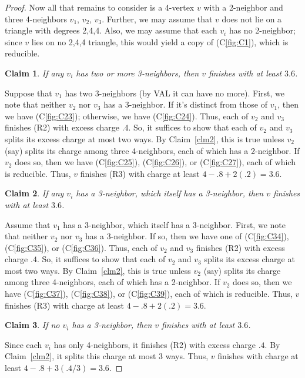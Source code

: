 \documentclass[12pt]{article}
\theoremstyle{plain}
\newtheorem{clm}{Claim}
\theoremstyle{definition}
\theoremstyle{remark}
\begin{document}
\begin{proof}
	Now all that remains to consider is a 4-vertex $v$ with a 2-neighbor and three
	4-neighbors $v_1$, $v_2$, $v_3$.  Further, we may assume that $v$ does not lie
	on a triangle with degrees 2,4,4.  Also, we may assume that each $v_i$ has no
	2-neighbor; since $v$ lies on no 2,4,4 triangle, this would yield a copy of
	(C\ref{fig:C1}), which is reducible.
	
	\begin{clm}
		If any $v_i$ has two or more 3-neighbors, then $v$ finishes with at least $3.6$.
		\label{clm5}
	\end{clm}
	
	Suppose that $v_1$ has two 3-neighbors (by VAL it can have no more).  First, we
	note that neither $v_2$ nor $v_3$ has a 3-neighbor.  If it's distinct from those
	of $v_1$, then we have (C\ref{fig:C23}); otherwise, we have (C\ref{fig:C24}).
	Thus, each of $v_2$ and $v_3$ finishes (R2) with excess charge $.4$.  So, it
	suffices to show that each of $v_2$ and $v_3$ splits its excess charge at most
	two ways.  By Claim~\ref{clm2}, this is true unless $v_2$ (say) splits its
	charge among three 4-neighbors, each of which has a 2-neighbor. If $v_2$ does
	so, then we have (C\ref{fig:C25}), (C\ref{fig:C26}), or (C\ref{fig:C27}), each
	of which is reducible.  Thus, $v$ finishes (R3) with charge at least
	$4-.8+2(.2)=3.6$.
	
	\begin{clm}
		If any $v_i$ has a 3-neighbor, which itself has a 3-neighbor, then $v$ finishes
		with at least $3.6$.
		\label{clm6}
	\end{clm}
	Assume that $v_1$ has a 3-neighbor, which itself has a 3-neighbor.
	First, we note that neither $v_2$ nor $v_3$ has a 3-neighbor.
	If so, then we have one of (C\ref{fig:C34}), (C\ref{fig:C35}), or
	(C\ref{fig:C36}).
	Thus, each of $v_2$ and $v_3$ finishes (R2) with excess charge $.4$.  So, it
	suffices to show that each of $v_2$ and $v_3$ splits its excess charge at most
	two ways.  By Claim~\ref{clm2}, this is true unless $v_2$ (say) splits its
	charge among three 4-neighbors, each of which has a 2-neighbor. 
	If $v_2$ does so, then we have 
	(C\ref{fig:C37}), (C\ref{fig:C38}), or (C\ref{fig:C39}), each
	of which is reducible.  
	Thus, $v$ finishes (R3) with charge at least $4-.8+2(.2)=3.6$.
	
	\begin{clm}
		If no $v_i$ has a 3-neighbor, then $v$ finishes with at least $3.6$.
		\label{clm7}
	\end{clm}
	Since each $v_i$ has only 4-neighbors, it finishes (R2) with excess charge $.4$.
	By Claim~\ref{clm2}, it splits this charge at most 3 ways.  Thus, $v$ finishes
	with charge at least $4-.8+3(.4/3)=3.6$.
	

\end{proof}
\end{document}
